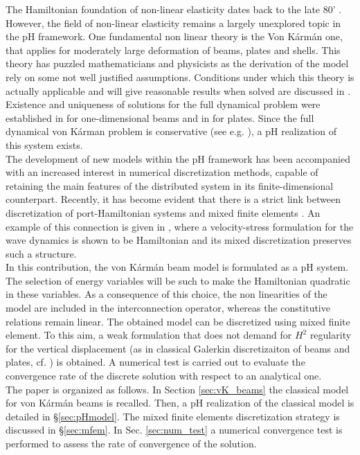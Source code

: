 \documentclass{ifacconf}
\newcommand{\secref}[1]{\S\ref{#1}}
\begin{document}
The Hamiltonian foundation of non-linear elasticity dates back to the late 80' \cite{simo1988}. However, the field of non-linear elasticity remains a largely unexplored topic in the pH framework. One fundamental non linear theory is the Von K\'arm\'an one, that applies for moderately large deformation of beams, plates and shells. This theory has puzzled mathematicians and physicists as the derivation of the model rely on some not well justified assumptions. Conditions under which this theory is actually applicable and will give reasonable results when solved are discussed in \cite{ciarlet1980,ciarlet1990}. Existence and uniqueness of solutions for the full dynamical problem were established in \cite{lagnese1991uniform} for one-dimensional beams and in \cite{puel1996} for plates. Since the full dynamical von K\'arman problem is conservative (see e.g. \cite{bilbao2015conservative}), a pH realization of this system exists. \\

The development of new models within the pH framework has been accompanied with an increased interest in numerical discretization methods, capable of retaining the main features of the distributed system in its finite-dimensional counterpart. Recently, it has become evident that there is a strict link between  discretization of port-Hamiltonian  systems and mixed finite elements \cite{cardoso2020pfem}. An example of this connection is given in \cite{kirby2015}, where a velocity-stress formulation for the wave dynamics is shown to be Hamiltonian and its mixed discretization preserves such a structure. \\

In this contribution, the von K\'arm\'an beam model is formulated as a pH system. The selection of energy variables will be such to make the Hamiltonian quadratic in these variables. As a consequence of this choice, the non linearities of the model are included in the interconnection operator, whereas the constitutive relations remain linear. The obtained model can be discretized using mixed finite element. To this aim, a weak formulation that does not demand for $H^2$ regularity for the vertical displacement (as in classical Galerkin discretizaiton of beams and plates, cf. \cite{gustafsson2018}) is obtained. A numerical test is carried out to evaluate the convergence rate of the discrete solution with respect to an analytical one. \\

The paper is organized as follows. In Section \ref{sec:vK_beams} the classical model for von K\'arm\'an beams is recalled. Then, a pH realization of the classical model is detailed in \secref{sec:pHmodel}. The mixed finite elements discretization strategy is discussed in \secref{sec:mfem}. In Sec. \ref{sec:num_test} a numerical convergence test is performed to assess the rate of convergence of the solution.
\end{document}

